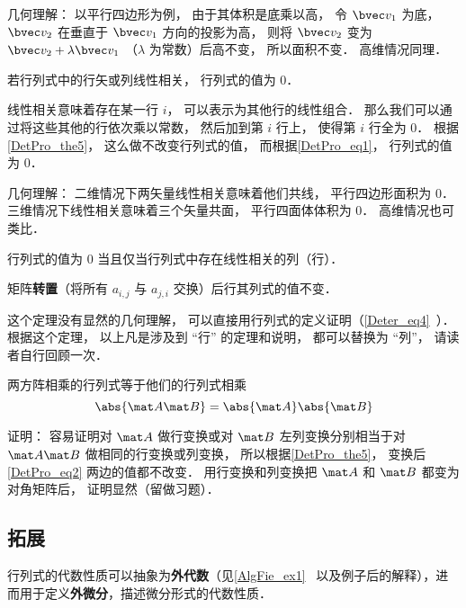 几何理解： 以平行四边形为例， 由于其体积是底乘以高， 令 $\bvec v_1$ 为底， $\bvec v_2$ 在垂直于 $\bvec v_1$ 方向的投影为高， 则将 $\bvec v_2$ 变为 $\bvec v_2 + \lambda \bvec v_1$ （$\lambda$ 为常数）后高不变， 所以面积不变． 高维情况同理．

\begin{theorem}{ }
若行列式中的行矢或列线性相关， 行列式的值为 0．
\end{theorem}
线性相关意味着存在某一行 $i$， 可以表示为其他行的线性组合． 那么我们可以通过将这些其他的行依次乘以常数， 然后加到第 $i$ 行上， 使得第 $i$ 行全为 0． 根据\autoref{DetPro_the5}， 这么做不改变行列式的值， 而根据\autoref{DetPro_eq1}， 行列式的值为 0．

几何理解： 二维情况下两矢量线性相关意味着他们共线， 平行四边形面积为 0． 三维情况下线性相关意味着三个矢量共面， 平行四面体体积为 0． 高维情况也可类比．

\begin{theorem}{ } \label{DetPro_the2}
行列式的值为 0 当且仅当行列式中存在线性相关的列（行）．
\end{theorem}

\begin{theorem}{ }\label{DetPro_the7}
矩阵\textbf{转置}（将所有 $a_{i,j}$ 与 $a_{j,i}$ 交换）后行其列式的值不变．
\end{theorem}
这个定理没有显然的几何理解， 可以直接用行列式的定义证明（\autoref{Deter_eq4}~）． 根据这个定理， 以上凡是涉及到 “行” 的定理和说明， 都可以替换为 “列”， 请读者自行回顾一次．

\begin{theorem}{}\label{DetPro_the8}
两方阵相乘的行列式等于他们的行列式相乘
\begin{equation}\label{DetPro_eq2}
\abs{\mat A \mat B} = \abs{\mat A}\abs{\mat B}
\end{equation}
\end{theorem}
证明： 容易证明对 $\mat A$ 做行变换或对 $\mat B$ 左列变换分别相当于对 $\mat A\mat B$ 做相同的行变换或列变换， 所以根据\autoref{DetPro_the5}， 变换后\autoref{DetPro_eq2} 两边的值都不改变． 用行变换和列变换把 $\mat A$ 和 $\mat B$ 都变为对角矩阵后， 证明显然（留做习题）．

\subsection{拓展}

行列式的代数性质可以抽象为\textbf{外代数}（见\autoref{AlgFie_ex1}~ 以及例子后的解释），进而用于定义\textbf{外微分}，描述微分形式的代数性质．
